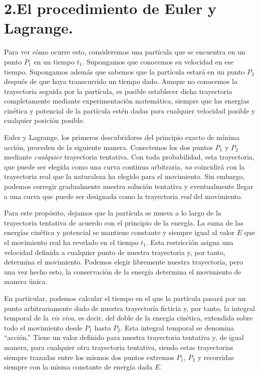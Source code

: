 \section*{2.\quad El procedimiento de Euler y Lagrange.}

Para ver cómo ocurre esto, consideremos una partícula que se encuentra en un punto $P_1$ en un tiempo $t_1$. Supongamos que conocemos su velocidad en ese tiempo. Supongamos además que sabemos que la partícula estará en un punto $P_2$ después de que haya transcurrido un tiempo dado. Aunque no conocemos la trayectoria seguida por la partícula, es posible establecer dicha trayectoria completamente mediante experimentación matemática, siempre que las energías cinética y potencial de la partícula estén dadas para cualquier velocidad posible y cualquier posición posible.

Euler y Lagrange, los primeros descubridores del principio exacto de mínima acción, proceden de la siguiente manera. Conectemos los dos puntos $P_1$ y $P_2$ mediante \textit{cualquier} trayectoria tentativa. Con toda probabilidad, esta trayectoria, que puede ser elegida como una curva continua arbitraria, \textit{no} coincidirá con la trayectoria real que la naturaleza ha elegido para el movimiento. Sin embargo, podemos corregir gradualmente nuestra solución tentativa y eventualmente llegar a una curva que puede ser designada como la trayectoria \textit{real} del movimiento.

Para este propósito, dejamos que la partícula se mueva a lo largo de la trayectoria tentativa de acuerdo con el principio de la energía. La suma de las energías cinética y potencial se mantiene constante y siempre igual al valor $E$ que el movimiento real ha revelado en el tiempo $t_1$. Esta restricción asigna una velocidad definida a cualquier punto de nuestra trayectoria y, por tanto, determina el movimiento. Podemos elegir libremente nuestra trayectoria, pero una vez hecho esto, la conservación de la energía determina el movimiento de manera única.

En particular, podemos calcular el tiempo en el que la partícula pasará por un punto arbitrariamente dado de nuestra trayectoria ficticia y, por tanto, la integral temporal de la \textit{vis viva}, es decir, del doble de la energía cinética, extendida sobre todo el movimiento desde $P_1$ hasta $P_2$. Esta integral temporal se denomina ``acción.'' Tiene un valor definido para nuestra trayectoria tentativa y, de igual manera, para cualquier otra trayectoria tentativa, siendo estas trayectorias siempre trazadas entre los mismos dos puntos extremos $P_1$, $P_2$ y recorridas siempre con la misma constante de energía dada $E$.

